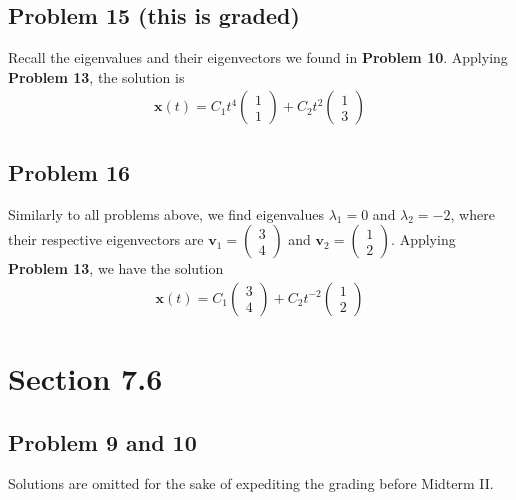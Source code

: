 \documentclass[12pt]{article}
\begin{document}
\subsection*{Problem 15 (this is graded)}
\label{sec:org2a1ebc4}
Recall the eigenvalues and their eigenvectors we found in \textbf{Problem
10}. Applying \textbf{Problem 13}, the solution is
\begin{align*}
        \mathbf{x}(t) = C_1 t^4 \begin{pmatrix} 1\\ 1\end{pmatrix}
        + C_2 t^2 \begin{pmatrix} 1\\ 3\end{pmatrix}
\end{align*}
\subsection*{Problem 16}
\label{sec:org05c00a8}
Similarly to all problems above, we find eigenvalues
\(\lambda_1 = 0\) and \(\lambda_2 = -2\), where their respective eigenvectors are
\(\mathbf{v}_1 = \begin{pmatrix} 3 \\ 4\end{pmatrix}\) and
\(\mathbf{v}_2 = \begin{pmatrix} 1 \\ 2\end{pmatrix}\). Applying \textbf{Problem 13}, we
have the solution
\begin{align*}
        \mathbf{x}(t) = C_1 \begin{pmatrix} 3\\ 4\end{pmatrix} +
        C_2 t^{-2} \begin{pmatrix} 1\\ 2\end{pmatrix}
\end{align*}
\section*{Section 7.6}
\label{sec:orgf6210bf}
\subsection*{Problem 9 and 10}
\label{sec:orgf005e04}
Solutions are omitted for the sake of expediting the grading before Midterm
II. 
\end{document}
